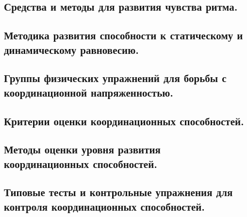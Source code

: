 \subsection{Средства и методы для развития чувства ритма.}



\subsection{Методика развития способности к статическому и динамическому равновесию.}



\subsection{Группы физических упражнений для борьбы с координационной напряженностью.}



\subsection{Критерии оценки координационных способностей.}



\subsection{Методы оценки уровня развития координационных способностей.}



\subsection{Типовые тесты и контрольные упражнения для контроля координационных способностей.}
